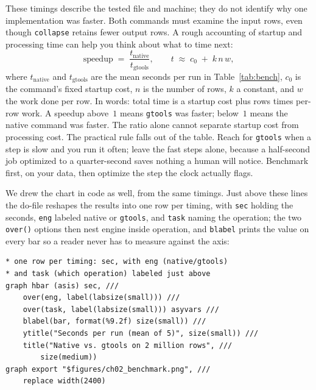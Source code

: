 \documentclass[
    a4paper,
    fontsize=10pt,
    twoside=true,
    numbers=noenddot,
]{kaobook}
\begin{document}
These timings describe the tested file and machine; they do not identify why one implementation was faster. Both commands must examine the input rows, even though \texttt{collapse} retains fewer output rows. A rough accounting of startup and processing time can help you think about what to time next:
\[
  \text{speedup} \;=\; \frac{t_{\text{native}}}{t_{\text{gtools}}},
  \qquad
  t \;\approx\; c_{0} \;+\; k\,n\,w,
\]
where $t_{\text{native}}$ and $t_{\text{gtools}}$ are the mean seconds per run in Table~\ref{tab:bench}, $c_{0}$ is the command's fixed startup cost, $n$ is the number of rows, $k$ a constant, and $w$ the work done per row. In words: total time is a startup cost plus rows times per-row work. A speedup above~$1$ means \texttt{gtools} was faster; below~$1$ means the native command was faster. The ratio alone cannot separate startup cost from processing cost. The practical rule falls out of the table. Reach for \texttt{gtools} when a step is slow and you run it often; leave the fast steps alone, because a half-second job optimized to a quarter-second saves nothing a human will notice. Benchmark first, on your data, then optimize the step the clock actually flags.

We drew the chart in code as well, from the same timings. Just above these lines the do-file reshapes the results into one row per timing, with \texttt{sec} holding the seconds, \texttt{eng} labeled native or \texttt{gtools}, and \texttt{task} naming the operation; the two \texttt{over()} options then nest engine inside operation, and \texttt{blabel} prints the value on every bar so a reader never has to measure against the axis:
\par
{\footnotesize
\begin{verbatim}
* one row per timing: sec, with eng (native/gtools)
* and task (which operation) labeled just above
graph hbar (asis) sec, ///
    over(eng, label(labsize(small))) ///
    over(task, label(labsize(small))) asyvars ///
    blabel(bar, format(%9.2f) size(small)) ///
    ytitle("Seconds per run (mean of 5)", size(small)) ///
    title("Native vs. gtools on 2 million rows", ///
        size(medium))
graph export "$figures/ch02_benchmark.png", ///
    replace width(2400)
\end{verbatim}
}
\end{document}
